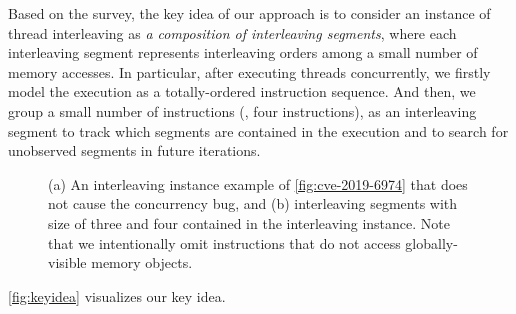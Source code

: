 %
Based on the survey, the key idea of our approach is to consider an
instance of thread interleaving as \textit{a composition of
  interleaving segments}, where each interleaving segment represents
interleaving orders among a small number of memory accesses.
%
In particular, after executing threads concurrently, we firstly model
the execution as a totally-ordered instruction sequence.
%
And then, we group a small number of instructions (\eg, four
instructions), as an interleaving segment to track which segments are
contained in the execution and to search for unobserved segments in
future iterations.

\begin{figure}[t]
  \hfill
  \caption{(a) An interleaving instance example of
    \autoref{fig:cve-2019-6974} that does not cause the concurrency
    bug, and (b) interleaving segments with size of three and four
    contained in the interleaving instance. Note that we intentionally
    omit instructions that do not access globally-visible memory
    objects.}
  \label{fig:keyidea}
\end{figure}
%
\autoref{fig:keyidea} visualizes our key idea.
